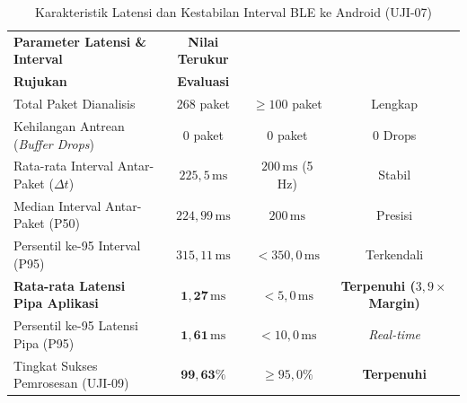 \begin{table}[htbp]
\centering
\caption{Karakteristik Latensi dan Kestabilan Interval BLE ke Android (UJI-07)}
\label{tab:test07_latency_results}
\small
\setlength{\tabcolsep}{5pt}
\begin{tabular}{|p{5.5cm}|c|c|c|}
\hline
\textbf{Parameter Latensi \& Interval} & \textbf{Nilai Terukur} & \shortstack{\textbf{Target} \\ \textbf{Rujukan}} & \textbf{Evaluasi} \\ \hline
Total Paket Dianalisis & 268 paket & $\ge 100$ paket & Lengkap \\ \hline
Kehilangan Antrean (\textit{Buffer Drops}) & 0 paket & 0 paket & 0 Drops \\ \hline
Rata-rata Interval Antar-Paket ($\Delta t$) & $225{,}5\,\mathrm{ms}$ & $200\,\mathrm{ms}$ (5 Hz) & Stabil \\ \hline
Median Interval Antar-Paket (P50) & $224{,}99\,\mathrm{ms}$ & $200\,\mathrm{ms}$ & Presisi \\ \hline
Persentil ke-95 Interval (P95) & $315{,}11\,\mathrm{ms}$ & $< 350{,}0\,\mathrm{ms}$ & Terkendali \\ \hline
\textbf{Rata-rata Latensi Pipa Aplikasi} & $\mathbf{1{,}27\,\mathrm{ms}}$ & $< 5{,}0\,\mathrm{ms}$ & \textbf{Terpenuhi ($3{,}9\times$ Margin)} \\ \hline
Persentil ke-95 Latensi Pipa (P95) & $\mathbf{1{,}61\,\mathrm{ms}}$ & $< 10{,}0\,\mathrm{ms}$ & \textit{Real-time} \\ \hline
Tingkat Sukses Pemrosesan (UJI-09) & $\mathbf{99{,}63\%}$ & $\ge 95{,}0\%$ & \textbf{Terpenuhi} \\ \hline
\end{tabular}
\end{table}

